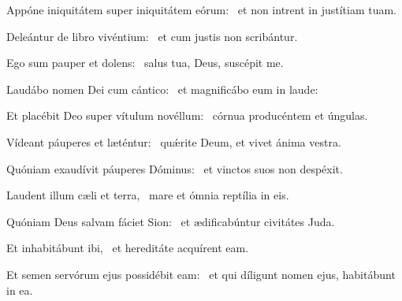 \item Appóne iniquitátem super iniquitátem eórum:~\psstar{} et non intrent in justítiam tuam.

\item Deleántur de libro vivéntium:~\psstar{} et cum justis non scribántur.

\item Ego sum pauper et dolens:~\psstar{} salus tua, Deus, suscépit me.

\item Laudábo nomen Dei cum cántico:~\psstar{} et magnificábo eum in laude:

\item Et placébit Deo super vítulum novéllum:~\psstar{} córnua producéntem et úngulas.

\item Vídeant páuperes et læténtur:~\psstar{} quǽrite Deum, et vivet ánima vestra.

\item Quóniam exaudívit páuperes Dóminus:~\psstar{} et vinctos suos non despéxit.

\item Laudent illum cæli et terra,~\psstar{} mare et ómnia reptília in eis.

\item Quóniam Deus salvam fáciet Sion:~\psstar{} et ædificabúntur civitátes Juda.

\item Et inhabitábunt ibi,~\psstar{} et hereditáte acquírent eam.

\item Et semen servórum ejus possidébit eam:~\psstar{} et qui díligunt nomen ejus, habitábunt in ea.